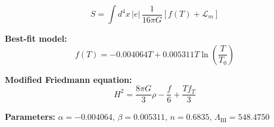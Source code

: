 
\begin{equation}
  S = \int d^4x \, |e| \, \frac{1}{16\pi G} \left[ f(T) + \mathcal{L}_m \right]
\end{equation}

\textbf{Best-fit model:}
\begin{equation}
  f(T) = -0.004064 T + 0.005311 T \ln\!\left(\frac{T}{T_0}\right)
\end{equation}

\textbf{Modified Friedmann equation:}
\begin{equation}
  H^2 = \frac{8\pi G}{3} \rho - \frac{f}{6} + \frac{T f_T}{3}
\end{equation}

\textbf{Parameters:}
$\alpha = -0.004064$, \quad
$\beta = 0.005311$, \quad
$n = 0.6835$, \quad
$\Lambda_{\text{BI}} = 548.4750$